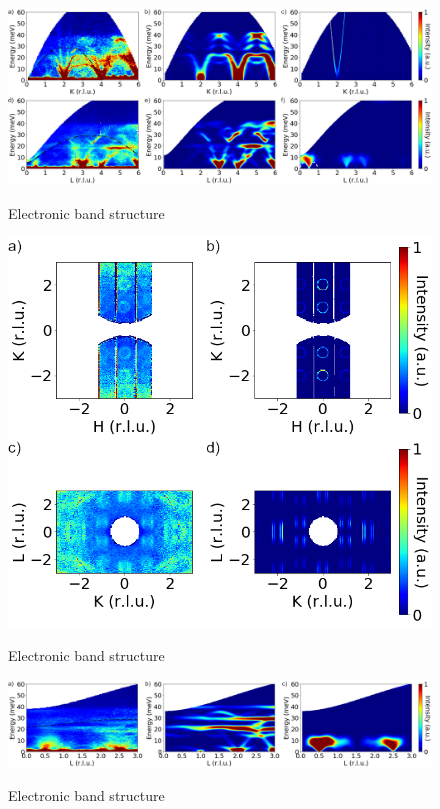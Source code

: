 \documentclass[11pt,edeposit,draftthesis]{uiucthesis2020}
\begin{document}
\begin{mainmatter}
\begin{figure}
\centering\includegraphics[width=\columnwidth]{figures/ch8/phonon_spectra_magnon_spectra_combined.png} \\
\caption{\label{fig:phonon_magnon_spectra}
Electronic band structure
}
\end{figure}

\begin{figure}
\centering\includegraphics[width=\columnwidth]{figures/ch8/constant_energy_slices.png} \\
\caption{\label{fig:constant_energy_slices}
Electronic band structure
}
\end{figure}

\begin{figure}
\centering\includegraphics[width=\columnwidth]{figures/ch8/suppl_01L_INS_data.png} \\
\caption{\label{fig:01L_spectra}
Electronic band structure
}
\end{figure}


\end{mainmatter}
\end{document}
